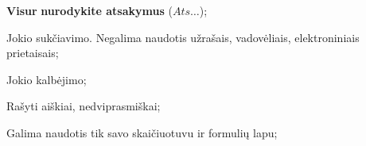 \documentclass[a4paper]{article}
\begin{document}
\begin{small}
      \begin{enumerate*}[label={(\arabic*)}]
            \item \textbf{Visur} \textbf{nurodykite atsakymus} ($Ats\ldots$);
            \item Jokio sukčiavimo. Negalima naudotis užrašais, vadovėliais, elektroniniais
                  prietaisais;
            \item Jokio kalbėjimo;
            \item Rašyti aiškiai, nedviprasmiškai;
            \item Galima naudotis tik savo skaičiuotuvu ir formulių lapu;
      \end{enumerate*}
\end{small}
\end{document}
